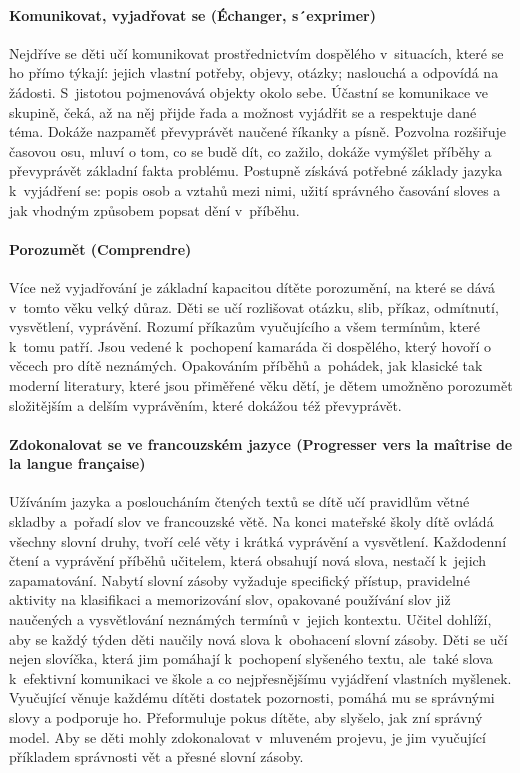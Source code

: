 			\paragraph{Komunikovat, vyjadřovat se (Échanger, s´exprimer)}
			\break
			Nejdříve se děti učí komunikovat prostřednictvím dospělého v situacích, které se ho přímo týkají: jejich vlastní potřeby, objevy, otázky; naslouchá a odpovídá na žádosti. S jistotou pojmenovává objekty okolo sebe. Účastní se komunikace ve skupině, čeká, až na něj přijde řada a možnost vyjádřit se a respektuje dané téma. Dokáže nazpaměť převyprávět naučené říkanky a písně. Pozvolna rozšiřuje časovou osu, mluví o tom, co se budě dít, co zažilo, dokáže vymýšlet příběhy a převyprávět základní fakta problému. Postupně získává potřebné základy jazyka k vyjádření se: popis osob a vztahů mezi nimi, užití správného časování sloves a jak vhodným způsobem popsat dění v příběhu.

			\paragraph{Porozumět (Comprendre)}
			Více než vyjadřování je základní kapacitou dítěte porozumění, na které se dává v tomto věku velký důraz.
			Děti se učí rozlišovat otázku, slib, příkaz, odmítnutí, vysvětlení, vyprávění. Rozumí příkazům vyučujícího a všem termínům, které k tomu patří. Jsou vedené k pochopení kamaráda či dospělého, který hovoří o věcech pro dítě neznámých. Opakováním příběhů a pohádek, jak klasické tak moderní literatury, které jsou přiměřené věku dětí, je dětem umožněno porozumět složitějším a delším vyprávěním, které dokážou též převyprávět. 

			\paragraph{Zdokonalovat se ve francouzském jazyce (Progresser vers la maîtrise de la langue française)}
			Užíváním jazyka a posloucháním čtených textů se dítě učí pravidlům větné skladby a pořadí slov ve francouzské větě. Na konci mateřské školy dítě ovládá všechny slovní druhy, tvoří celé věty i krátká vyprávění a vysvětlení. Každodenní čtení a vyprávění příběhů učitelem, která obsahují nová slova, nestačí k jejich zapamatování. Nabytí slovní zásoby vyžaduje specifický přístup, pravidelné aktivity na klasifikaci a memorizování slov, opakované používání slov již naučených a vysvětlování neznámých termínů v jejich kontextu. Učitel dohlíží, aby se každý týden děti naučily nová slova k obohacení slovní zásoby. Děti se učí nejen slovíčka, která jim pomáhají k pochopení slyšeného textu, ale také slova k efektivní komunikaci ve škole a co nejpřesnějšímu vyjádření vlastních myšlenek. Vyučující věnuje každému dítěti dostatek pozornosti, pomáhá mu se správnými slovy a podporuje ho. Přeformuluje pokus dítěte, aby slyšelo, jak zní správný model. Aby se děti mohly zdokonalovat v mluveném projevu, je jim vyučující příkladem správnosti vět a přesné slovní zásoby.


